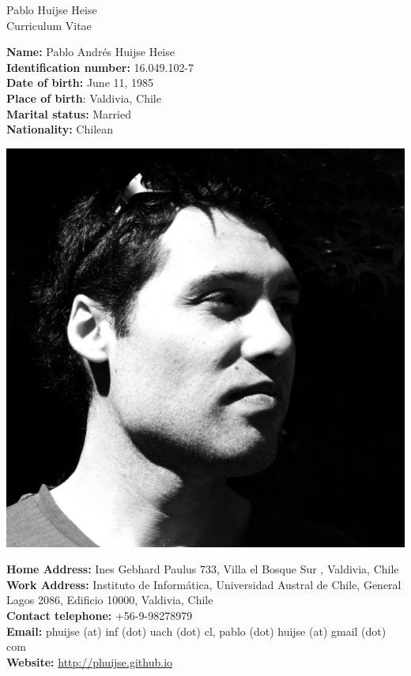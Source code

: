 \documentclass[letterpaper,11pt]{article}
\begin{document}
\begin{center}\Huge{Pablo Huijse Heise} \\ \Large{Curriculum Vitae} \end{center}



\vspace{10mm}
\begin{minipage}[t]{0.6\textwidth}
	\textbf{Name:} Pablo Andr\'es Huijse Heise \\
	\textbf{Identification number:} 16.049.102-7 \\	
	\textbf{Date of birth:} June 11, 1985  \\
	\textbf{Place of birth}: Valdivia, Chile \\
	\textbf{Marital status:} Married \\
	\textbf{Nationality:} Chilean \\
	
  
\end{minipage}
\begin{minipage}[t]{0.4\textwidth}

\centering
\vspace*{-10pt} \includegraphics[scale=0.13]{../img/avatar.png}

	
\end{minipage}
	\textbf{Home Address:} Ines Gebhard Paulus 733, Villa el Bosque Sur , Valdivia, Chile \\
	\textbf{Work Address:} Instituto de Inform\'atica, Universidad Austral de Chile, General Lagos 2086, Edificio 10000, Valdivia, Chile \\
	\textbf{Contact telephone:} +56-9-98278979\\
	\textbf{Email:} phuijse (at) inf (dot) uach (dot) cl, pablo (dot) huijse (at) gmail (dot) com \\ 	
	\textbf{Website:} \url{http://phuijse.github.io} \\
\end{document}
